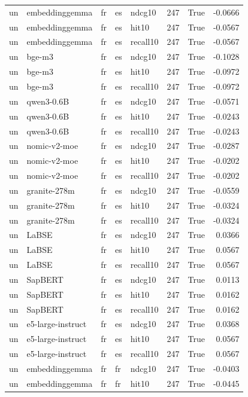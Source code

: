 \begin{tabular}{lllllrrr}
un & embeddinggemma & fr & es & ndcg10 & 247 & True & -0.0666 \\
un & embeddinggemma & fr & es & hit10 & 247 & True & -0.0567 \\
un & embeddinggemma & fr & es & recall10 & 247 & True & -0.0567 \\
un & bge-m3 & fr & es & ndcg10 & 247 & True & -0.1028 \\
un & bge-m3 & fr & es & hit10 & 247 & True & -0.0972 \\
un & bge-m3 & fr & es & recall10 & 247 & True & -0.0972 \\
un & qwen3-0.6B & fr & es & ndcg10 & 247 & True & -0.0571 \\
un & qwen3-0.6B & fr & es & hit10 & 247 & True & -0.0243 \\
un & qwen3-0.6B & fr & es & recall10 & 247 & True & -0.0243 \\
un & nomic-v2-moe & fr & es & ndcg10 & 247 & True & -0.0287 \\
un & nomic-v2-moe & fr & es & hit10 & 247 & True & -0.0202 \\
un & nomic-v2-moe & fr & es & recall10 & 247 & True & -0.0202 \\
un & granite-278m & fr & es & ndcg10 & 247 & True & -0.0559 \\
un & granite-278m & fr & es & hit10 & 247 & True & -0.0324 \\
un & granite-278m & fr & es & recall10 & 247 & True & -0.0324 \\
un & LaBSE & fr & es & ndcg10 & 247 & True & 0.0366 \\
un & LaBSE & fr & es & hit10 & 247 & True & 0.0567 \\
un & LaBSE & fr & es & recall10 & 247 & True & 0.0567 \\
un & SapBERT & fr & es & ndcg10 & 247 & True & 0.0113 \\
un & SapBERT & fr & es & hit10 & 247 & True & 0.0162 \\
un & SapBERT & fr & es & recall10 & 247 & True & 0.0162 \\
un & e5-large-instruct & fr & es & ndcg10 & 247 & True & 0.0368 \\
un & e5-large-instruct & fr & es & hit10 & 247 & True & 0.0567 \\
un & e5-large-instruct & fr & es & recall10 & 247 & True & 0.0567 \\
un & embeddinggemma & fr & fr & ndcg10 & 247 & True & -0.0403 \\
un & embeddinggemma & fr & fr & hit10 & 247 & True & -0.0445 \\

\end{tabular}
